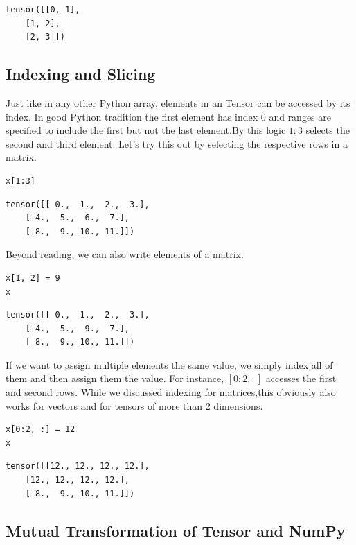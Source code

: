 \documentclass[]{article}
\begin{document}
\begin{verbatim}
tensor([[0, 1],
	[1, 2],
	[2, 3]])
\end{verbatim}

\subsection{Indexing and Slicing}

Just like in any other Python array, elements in an Tensor can be accessed by its index. In good Python tradition the first element has index 0 and ranges are specified to include the first but not the last element.By this logic $ 1:3 $ selects the second and third element. Let’s try this out by selecting the respective rows in a matrix.

\begin{verbatim}
x[1:3]
\end{verbatim}

\begin{verbatim}
tensor([[ 0.,  1.,  2.,  3.],
	[ 4.,  5.,  6.,  7.],
	[ 8.,  9., 10., 11.]])
\end{verbatim}

Beyond reading, we can also write elements of a matrix.

\begin{verbatim}
x[1, 2] = 9
x
\end{verbatim}

\begin{verbatim}
tensor([[ 0.,  1.,  2.,  3.],
	[ 4.,  5.,  9.,  7.],
	[ 8.,  9., 10., 11.]])
\end{verbatim}

If we want to assign multiple elements the same value, we simply index all of them and then assign them the value. For instance, $ [0:2, :] $ accesses the first and second rows. While we discussed indexing for matrices,this obviously also works for vectors and for tensors of more than 2 dimensions.

\begin{verbatim}
x[0:2, :] = 12
x
\end{verbatim}

\begin{verbatim}
tensor([[12., 12., 12., 12.],
	[12., 12., 12., 12.],
	[ 8.,  9., 10., 11.]])
\end{verbatim}

\subsection{Mutual Transformation of Tensor and NumPy}
\end{document}
